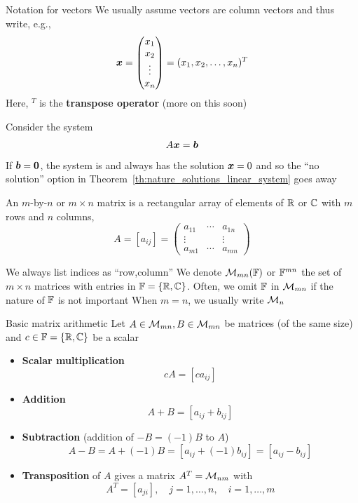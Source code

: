 \documentclass[aspectratio=169]{beamer}\usepackage[]{graphicx}\usepackage[]{xcolor}
\begin{document}
\begin{frame}{Notation for vectors}
We usually assume vectors are column vectors and thus write, e.g.,
\[ 
\bm{x}=
\begin{pmatrix}
x_1\\ x_2 \\ \vdots \\ x_n
\end{pmatrix}
= (x_1,x_2,\ldots,x_n)^T
\]
Here, $^T$ is the \textbf{transpose operator} (more on this soon)
\end{frame}



\begin{frame}
Consider the system
\[
A\bm{x}=\bm{b}
\]
\vfill
If $\bb=\b0$, the system is  and always has the solution $\bm{x}=0$ and so the ``no solution'' option in Theorem~\ref{th:nature_solutions_linear_system} goes away
\end{frame}



\begin{frame}
	\begin{definition}[Matrix]
		An $m$-by-$n$ or $m\times n$ matrix is a rectangular array of elements of $\mathbb{R}$ or $\mathbb{C}$ with $m$ rows and $n$ columns,
		\[
		A=[a_{ij}]=
		\begin{pmatrix}
		a_{11} & \cdots & a_{1n} \\
		\vdots & & \vdots \\
		a_{m1} & \cdots & a_{mn}
		\end{pmatrix}
		\]
	\end{definition}
	\vfill
	We always list indices as ``row,column''
	\vfill
	We denote $\mathcal{M}_{mn}(\mathbb{F})$ or $\mathbb{F}^{mn}$ the set of $m\times n$ matrices with entries in $\mathbb{F}=\{\mathbb{R},\mathbb{C}\}$. Often, we omit $\mathbb{F}$ in $\mathcal{M}_{mn}$ if the nature of $\mathbb{F}$ is not important
	\vfill
	When $m=n$, we usually write $\mathcal{M}_n$
\end{frame}

\begin{frame}{Basic matrix arithmetic}
Let $A\in\mathcal{M}_{mn},B\in\mathcal{M}_{mn}$ be matrices (of the same size) and $c\in\mathbb{F}=\{\mathbb{R},\mathbb{C}\}$ be a scalar
\begin{itemize}
	\item \textbf{Scalar multiplication}
	\[
	cA = [ca_{ij}]
	\]
	\item \textbf{Addition}
	\[
	A+B = [a_{ij}+b_{ij}]
	\]
	\item \textbf{Subtraction} (addition of $-B=(-1)B$ to $A$)
	\[
	A-B=A+(-1)B=[a_{ij}+(-1)b_{ij}]=[a_{ij}-b_{ij}]
	\]
	\item \textbf{Transposition} of $A$ gives a matrix $A^T=\mathcal{M}_{nm}$ with
	\[
	A^T=[a_{ji}],\quad j=1,\ldots,n,\quad i=1,\ldots,m
	\]
\end{itemize}
\end{frame}
\end{document}
